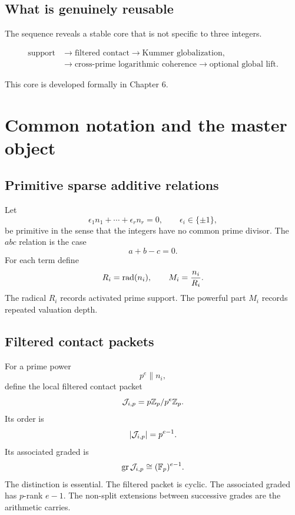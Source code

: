 
\section{What is genuinely reusable}
The sequence reveals a stable core that is not specific to three integers.

\[
\boxed{
\begin{aligned}
\text{support}
&\longrightarrow
\text{filtered contact}
\longrightarrow
\text{Kummer globalization},\\
&\longrightarrow
\text{cross-prime logarithmic coherence}
\longrightarrow
\text{optional global lift}.
\end{aligned}
}
\]

This core is developed formally in Chapter 6.

\chapter{Common notation and the master object}

\section{Primitive sparse additive relations}
Let
\[
\epsilon_1n_1+\cdots+\epsilon_rn_r=0,
\qquad
\epsilon_i\in\{\pm1\},
\]
be primitive in the sense that the integers have no common prime divisor. The $abc$ relation is the case
\[
a+b-c=0.
\]
For each term define
\[
R_i=\operatorname{rad}(n_i),
\qquad
M_i=\frac{n_i}{R_i}.
\]
The radical $R_i$ records activated prime support. The powerful part $M_i$ records repeated valuation depth.

\section{Filtered contact packets}
For a prime power
\[
p^e\parallel n_i,
\]
define the local filtered contact packet
\[
\mathcal J_{i,p}=p\mathbb Z_p/p^e\mathbb Z_p.
\]
Its order is
\[
\left|\mathcal J_{i,p}\right|=p^{e-1}.
\]
Its associated graded is
\[
\operatorname{gr}\mathcal J_{i,p}\cong(\mathbb F_p)^{e-1}.
\]
The distinction is essential. The filtered packet is cyclic. The associated graded has $p$-rank $e-1$. The non-split extensions between successive grades are the arithmetic carries.


